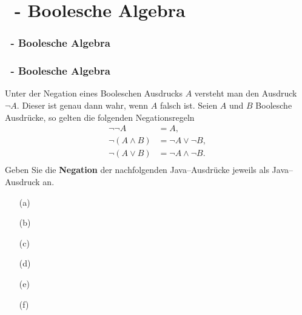 \def\stitle{\theexercise\ - Boolesche Algebra}
\section{\stitle}
\begin{frame}
    \frametitle{\stitle}
\tableofcontents[current]    
\end{frame}

\begin{frame}[t]%
  \frametitle{\stitle}

Unter der Negation eines Booleschen Ausdrucks $A$ versteht man den Ausdruck $\neg A$. Dieser ist genau dann wahr, wenn $A$ falsch ist. Seien $A$ und $B$ Boolesche Ausdrücke, so gelten die folgenden Negationsregeln
\begin{align*}
\neg \neg A &= A,\\
\neg (A \wedge B) &= \neg A \vee \neg B,\\
\neg (A \vee B)   &= \neg A \wedge \neg B. \\
\end{align*}
Geben Sie die \textbf{Negation} der nachfolgenden Java--Ausdrücke jeweils als Java--Ausdruck an.

\begin{center}
\begin{minipage}{0.35\textwidth}
\begin{itemize}
\item[(a)] 
\item[(b)] 
\item[(c)] 
\end{itemize}
\end{minipage}
\quad
\begin{minipage}{0.6\textwidth}
\begin{itemize}
\item[(d)] 
\item[(e)] 
\item[(f)] 
\end{itemize}
\end{minipage}
\end{center}

\end{frame}


